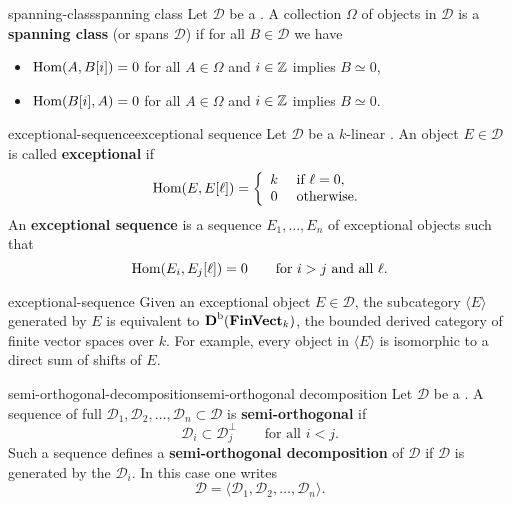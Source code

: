\begin{topic}{spanning-class}{spanning class}
    Let $\mathcal{D}$ be a . A collection $\Omega$ of objects in $\mathcal{D}$ is a \textbf{spanning class} (or spans $\mathcal{D}$) if for all $B \in \mathcal{D}$ we have
    \begin{itemize}
        \item $\text{Hom}(A, B[i]) = 0$ for all $A \in \Omega$ and $i \in \mathbb{Z}$ implies $B \simeq 0$,
        \item $\text{Hom}(B[i], A) = 0$ for all $A \in \Omega$ and $i \in \mathbb{Z}$ implies $B \simeq 0$.
    \end{itemize}
\end{topic}

\begin{topic}{exceptional-sequence}{exceptional sequence}
    Let $\mathcal{D}$ be a $k$-linear . An object $E \in \mathcal{D}$ is called \textbf{exceptional} if
    \[ \text{Hom}(E, E[\ell]) = \left\{\begin{array}{cl} k & \text{ if } \ell = 0, \\ 0 & \text{ otherwise.} \end{array}\right. \]
    An \textbf{exceptional sequence} is a sequence $E_1, \ldots, E_n$ of exceptional objects such that
    \[ \text{Hom}(E_i, E_j[\ell]) = 0 \qquad \text{for $i > j$ and all $\ell$}. \]
\end{topic}

\begin{example}{exceptional-sequence}
    Given an exceptional object $E \in \mathcal{D}$, the subcategory $\langle E \rangle$ generated by $E$ is equivalent to $\textbf{D}^\textup{b}(\textbf{FinVect}_k)$, the bounded derived category of finite vector spaces over $k$. For example, every object in $\langle E \rangle$ is isomorphic to a direct sum of shifts of $E$.
\end{example}

\begin{topic}{semi-orthogonal-decomposition}{semi-orthogonal decomposition}
    Let $\mathcal{D}$ be a . A sequence of full   $\mathcal{D}_1, \mathcal{D}_2, \ldots, \mathcal{D}_n \subset \mathcal{D}$ is \textbf{semi-orthogonal} if
    \[ \mathcal{D}_i \subset \mathcal{D}_j^\perp \qquad \text{for all $i < j$}. \]
    Such a sequence defines a \textbf{semi-orthogonal decomposition} of $\mathcal{D}$ if $\mathcal{D}$ is generated by the $\mathcal{D}_i$. In this case one writes
    \[ \mathcal{D} = \langle \mathcal{D}_1, \mathcal{D}_2, \ldots, \mathcal{D}_n \rangle . \]
\end{topic}

